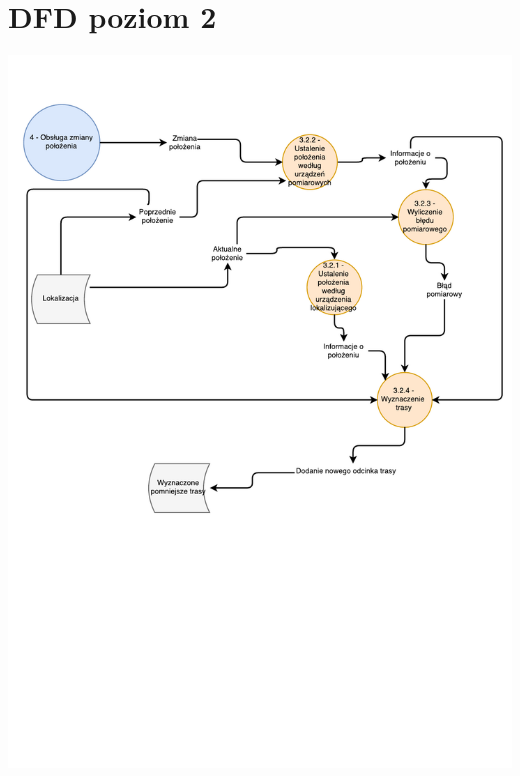 \documentclass[11pt]{article}
\begin{document}
	\section{DFD poziom 2}
	\begin{center}
		\includegraphics[scale=0.8]{DFD32.pdf}
	\end{center}
	\newpage
\end{document}
